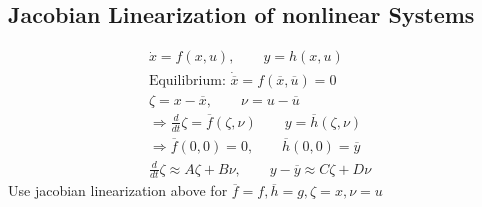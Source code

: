 \subsection*{Jacobian Linearization of nonlinear Systems}
    \begin{align*}
        \dot{x} = f(x, u), \quad \quad y = h(x, u)\\
        \text{Equilibrium: } \dot{\overline{x}} = f(\overline{x}, \overline{u}) = 0\\
        \zeta = x - \overline{x}, \quad \quad \nu = u - \overline{u}\\
        \Rightarrow \frac{d}{dt} \zeta = \overline{f}(\zeta, \nu) \quad \quad y = \overline{h}(\zeta, \nu)\\
        \Rightarrow \overline{f}(0, 0) = 0, \quad \quad \overline{h}(0, 0) = \overline{y}\\
        \frac{d}{dt} \zeta \approx A \zeta + B \nu, \quad \quad y - \overline{y} \approx C \zeta + D \nu%
    \end{align*}
    Use jacobian linearization above for $\overline{f} = f, \overline{h} = g, \zeta = x, \nu = u$
